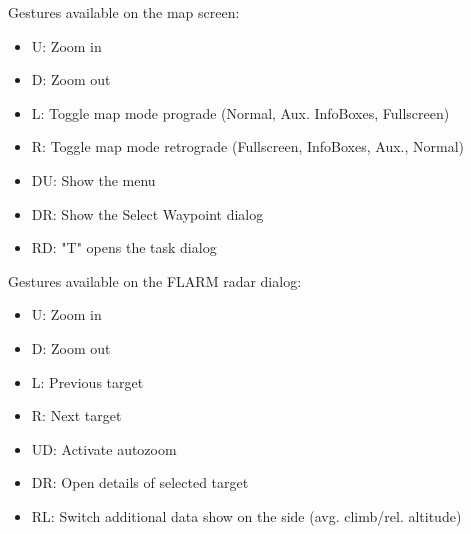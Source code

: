   Gestures available on the map screen:
\begin{itemize}
\item U: Zoom in
\item D: Zoom out
\item L: Toggle map mode prograde (Normal, Aux. InfoBoxes, Fullscreen)
\item R: Toggle map mode retrograde (Fullscreen, InfoBoxes, Aux., Normal)
\item DU: Show the menu
\item DR: Show the Select Waypoint dialog
\item RD: "T" opens the task dialog
\end{itemize}


  Gestures available on the FLARM radar dialog:
\begin{itemize}
\item U: Zoom in
\item D: Zoom out
\item L: Previous target
\item R: Next target
\item UD: Activate autozoom
\item DR: Open details of selected target
\item RL: Switch additional data show on the side (avg. climb/rel. altitude)
\end{itemize}

